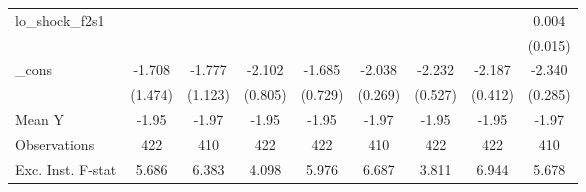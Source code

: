 {\begin{tabular}{l*{8}{c}}
\addlinespace
lo\_shock\_f2s1&                     &                     &                     &                     &                     &                     &                     &       0.004         \\
            &                     &                     &                     &                     &                     &                     &                     &     (0.015)         \\
\addlinespace
\_cons      &      -1.708         &      -1.777         &      -2.102\sym{**} &      -1.685\sym{**} &      -2.038\sym{***}&      -2.232\sym{***}&      -2.187\sym{***}&      -2.340\sym{***}\\
            &     (1.474)         &     (1.123)         &     (0.805)         &     (0.729)         &     (0.269)         &     (0.527)         &     (0.412)         &     (0.285)         \\
\midrule
Mean Y      &       -1.95         &       -1.97         &       -1.95         &       -1.95         &       -1.97         &       -1.95         &       -1.95         &       -1.97         \\
Observations&         422         &         410         &         422         &         422         &         410         &         422         &         422         &         410         \\
Exc. Inst. F-stat&       5.686         &       6.383         &       4.098         &       5.976         &       6.687         &       3.811         &       6.944         &       5.678         \\
\bottomrule
\end{tabular}
}
